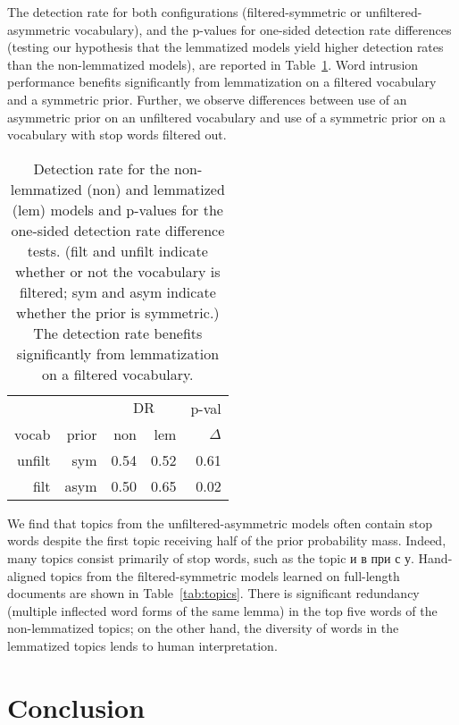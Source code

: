 \documentclass[11pt,letterpaper]{article}
\newcommand{\DR}{\ensuremath{\textrm{DR}}}
\begin{document}
{The detection rate for both configurations (filtered-symmetric or unfiltered-asymmetric
vocabulary), and the
p-values for one-sided detection rate differences (testing our
hypothesis that the lemmatized models yield higher detection rates than
the non-lemmatized models), are reported in
Table~\ref{tab:detection-rate}.  Word intrusion performance benefits
significantly from lemmatization on a filtered vocabulary and a
symmetric prior.
Further, we observe differences
between use of an asymmetric prior on an unfiltered vocabulary and
use of a symmetric prior on a vocabulary with stop words filtered out.

\begin{table}
  \centering
    \begin{tabular}{rrrrr}
        \toprule
              &              & \multicolumn{2}{c}{$\DR$} &       p-val   \\
        vocab & prior        & non         & lem &         $\Delta$ \\\midrule
        unfilt & sym         &          0.54 &          0.52 &          0.61 \\
        filt & asym & 0.50 & 0.65 & 0.02 \\
        \bottomrule
    \end{tabular}
    \caption{Detection rate for the non-lemmatized (non) and
        lemmatized (lem) models
        and p-values for the one-sided detection rate difference tests.
        (filt and unfilt indicate whether or not the vocabulary is
        filtered; sym and asym indicate whether the prior is
        symmetric.)
        The detection rate benefits significantly from lemmatization on
        a filtered vocabulary.}
    \label{tab:detection-rate}
\end{table}

We find that topics from the unfiltered-asymmetric models often contain
stop words despite the first topic receiving half of the prior
probability mass.  Indeed, many topics consist primarily of stop
words, such as the topic {и в при с у}.
Hand-aligned topics from the filtered-symmetric models learned on
full-length documents are shown in Table~\ref{tab:topics}.
There is significant redundancy (multiple inflected word forms of the
same lemma) in the top five words of the non-lemmatized topics; on the
other hand, the diversity of words in the lemmatized topics lends
to human interpretation.


\section{Conclusion}\label{sec:conclusion}

}
\end{document}
